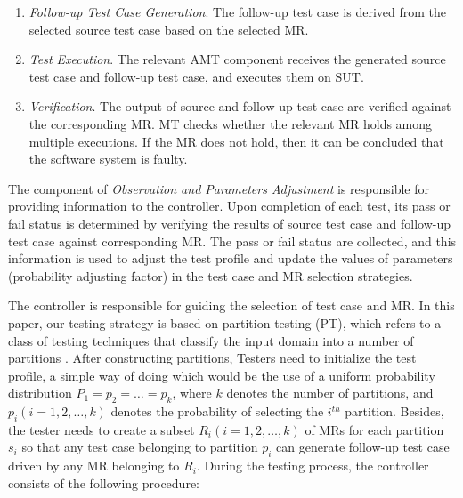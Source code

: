 \documentclass[10pt,journal,compsoc]{IEEEtran}
\begin{document}
\begin{enumerate}[1]  
  \item
  \emph{Follow-up Test Case Generation}. The follow-up test case is derived from the selected source test case based on the selected MR.

  \item
  \emph{Test Execution}. The relevant AMT component receives the generated source test case and follow-up test case, and executes them on SUT.

  \item
  \emph{Verification}.  The output of source and follow-up test case are verified against the corresponding MR. MT checks whether the relevant MR holds among multiple executions. If the MR does not hold, then it can be concluded that the software system is
  faulty.
\end{enumerate}

The component of \emph{Observation and Parameters Adjustment} is responsible for providing information to the controller. Upon completion of each test, its pass or fail status is determined by verifying the results of source test case and follow-up test case against corresponding MR. The pass or fail status are collected, and this information is used to adjust the test profile and update the values of parameters (probability adjusting factor) in the test case and MR selection strategies.

The controller is responsible for guiding the selection of test case and MR. In this paper, our testing strategy is based on partition testing (PT), which refers to a class of testing techniques that classify the input domain into a number of partitions \cite{weyuker1991analyzing}. After constructing partitions, Testers need to initialize the test profile, a simple way of doing which would be the use of a uniform probability distribution $P_1 = p_2 = \ldots = p_k$, where $k$ denotes the number of partitions, and $p_i (i = 1, 2, \ldots , k)$ denotes the probability of selecting the $i^{th}$ partition. Besides, the tester needs to create a subset $R_i (i = 1, 2, \ldots, k)$ of MRs for each partition $s_i$ so that any test case belonging to partition $p_i$ can generate follow-up test case driven by any MR belonging to $R_i$. During the testing process, the controller consists of the following procedure:
\end{document}
